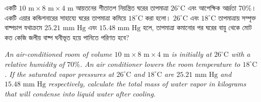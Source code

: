 \documentclass[12pt, a4paper]{article}
\begin{document}
\newpage
\begin{tcolorbox}[questionbox={প্রশ্ন (Question) 1}]
\noindent
একটি $10\text{ m} \times 8\text{ m} \times 4\text{ m}$ আয়তনের শীতাতপ নিয়ন্ত্রিত ঘরের তাপমাত্রা $26^\circ\text{C}$ এবং আপেক্ষিক আর্দ্রতা $70\%$। একটি এয়ার কন্ডিশনারের সাহায্যে ঘরের তাপমাত্রা কমিয়ে $18^\circ\text{C}$ করা হলো। $26^\circ\text{C}$ এবং $18^\circ\text{C}$ তাপমাত্রায় সম্পৃক্ত বাষ্পচাপ যথাক্রমে $25.21\text{ mm Hg}$ এবং $15.48\text{ mm Hg}$ হলে, তাপমাত্রা কমানোর পর ঘরের বায়ু থেকে মোট কত কেজি জলীয় বাষ্প ঘনীভূত হয়ে পানিতে পরিণত হবে?

\vspace{0.8em}
\begin{english}
\noindent\textit{\color{darkgray}
An air-conditioned room of volume $10\text{ m} \times 8\text{ m} \times 4\text{ m}$ is initially at $26^\circ\text{C}$ with a relative humidity of $70\%$. An air conditioner lowers the room temperature to $18^\circ\text{C}$. If the saturated vapor pressures at $26^\circ\text{C}$ and $18^\circ\text{C}$ are $25.21\text{ mm Hg}$ and $15.48\text{ mm Hg}$ respectively, calculate the total mass of water vapor in kilograms that will condense into liquid water after cooling.
}
\end{english}
\end{tcolorbox}
\end{document}
